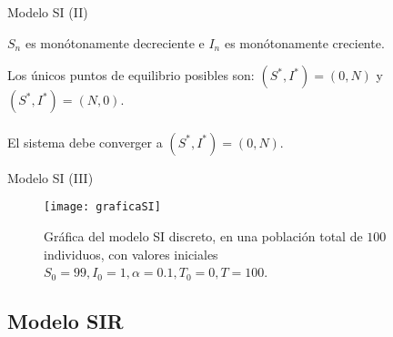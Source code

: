 \begin{frame}{Modelo SI (II)}
 
    

    \begin{lema}
        $S_n$ es monótonamente decreciente e $I_n$ es monótonamente creciente.
    \end{lema}

    \pause

    Los únicos puntos de equilibrio posibles son: $(S^*,I^*)=(0,N)$ y $(S^*,I^*)=(N,0)$.
    \\~\\
    El sistema debe converger a $(S^*,I^*)=(0,N)$.



\end{frame}

\begin{frame}{Modelo SI (III)}
    \begin{figure}
        \begin{center}
        \caption{Gráfica del modelo SI discreto, en una población total de $100$ individuos, con valores iniciales $S_0=99, I_0 = 1, \alpha = 0.1, T_0 = 0, T = 100$.}
        \texttt{[image: graficaSI]}
        \end{center}
    \end{figure}
\end{frame}




\subsection{Modelo SIR}


